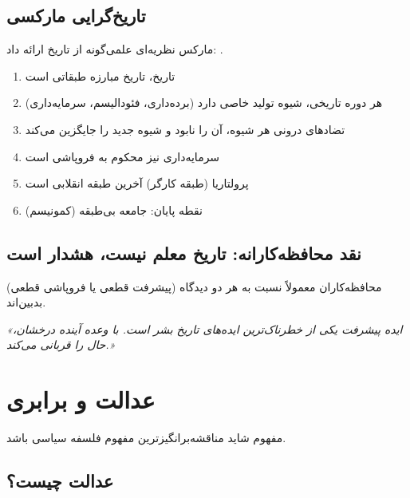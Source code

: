 \vspace{-8pt}

\subsection{تاریخ‌گرایی مارکسی}

مارکس نظریه‌ای علمی‌گونه از تاریخ ارائه داد: .

\begin{historybox}
	\begin{enumerate}[nosep]
		\item تاریخ، تاریخ مبارزه طبقاتی است
		\item هر دوره تاریخی، شیوه تولید خاصی دارد (برده‌داری، فئودالیسم، سرمایه‌داری)
		\item تضادهای درونی هر شیوه، آن را نابود و شیوه جدید را جایگزین می‌کند
		\item سرمایه‌داری نیز محکوم به فروپاشی است
		\item پرولتاریا (طبقه کارگر) آخرین طبقه انقلابی است
		\item نقطه پایان: جامعه بی‌طبقه (کمونیسم)
	\end{enumerate}
\end{historybox}

\subsection{نقد محافظه‌کارانه: تاریخ معلم نیست، هشدار است}

محافظه‌کاران معمولاً نسبت به هر دو دیدگاه (پیشرفت قطعی یا فروپاشی قطعی) بدبین‌اند.

\begin{quotebox}
	\textit{«ایده پیشرفت یکی از خطرناک‌ترین ایده‌های تاریخ بشر است. با وعده آینده درخشان، حال را قربانی می‌کند.»}
\end{quotebox}

\section{عدالت و برابری}

مفهوم  شاید مناقشه‌برانگیزترین مفهوم فلسفه سیاسی باشد.

\subsection{عدالت چیست؟}

